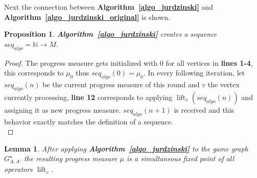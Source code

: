 \documentclass[12pt,oneside,bibliography=totoc,abstracton]{scrartcl}
\DeclareMathOperator{\lift}{lift}
\newcommand{\algoref}[1]{\textbf{Algorithm~\ref{#1}}}
\newtheorem{mylemma}{Lemma}
\newtheorem{myproposition}{Proposition}
\begin{document}
Next the connection between \algoref{algo_jurdzinski} and \algoref{algo_jurdzinski_original} is shown.
\begin{myproposition}\label{proposition_algotosequence}
	\algoref{algo_jurdzinski} creates a sequence $\textit{seq}_{\textit{algo}} = \mathbb{N} \to M$.
\end{myproposition}
\begin{proof}
	The progress measure gets initialized with $0$ for all
	vertices in \textbf{lines 1-4}, this corresponds to $\mu_0$ thus
	$\textit{seq}_{\textit{algo}}(0) = \mu_0$.
	In every following iteration, let $\textit{seq}_{\textit{algo}}(n)$ be the current progress measure
	of this round and $v$ the vertex currently processing, \textbf{line 12} corresponds to applying
	$\lift_v(\textit{seq}_{\textit{algo}}(n))$ and assigning it as new progress measure.
	$\textit{seq}_{\textit{algo}}(n + 1)$ is received and this behavior exactly matches
	the definition of a sequence.\\
\end{proof}
\begin{mylemma}\label{lemma_algotofixpoint}
	After applying \algoref{algo_jurdzinski} to the game graph $G^{\star}_{A, A'}$ the resulting
	progress measure $\mu$ is a \textnormal{simultaneous fixed point} of all operators $\lift_v$.
\end{mylemma}
\end{document}
